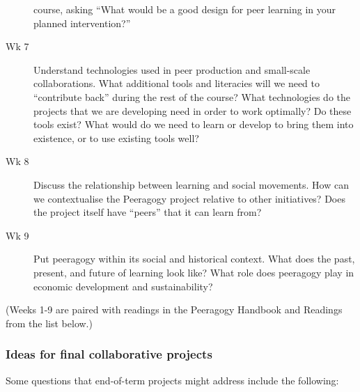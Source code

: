 \begin{description}
course, asking ``What would be a good design for peer learning in your
planned intervention?''
\item[Wk 7]
Understand technologies used in peer production and small-scale
collaborations. What additional tools and literacies will we need to
``contribute back'' during the rest of the course? What technologies do
the projects that we are developing need in order to work optimally? Do
these tools exist? What would do we need to learn or develop to bring
them into existence, or to use existing tools well?
\item[Wk 8]
Discuss the relationship between learning and social movements. How can
we contextualise the Peeragogy project relative to other initiatives?
Does the project itself have ``peers'' that it can learn from?
\item[Wk 9]
Put peeragogy within its social and historical context. What does the
past, present, and future of learning look like? What role does
peeragogy play in economic development and sustainability?
\end{description}

(Weeks 1-9 are paired with readings in the Peeragogy Handbook and
Readings from the list below.)

\hypertarget{ideas-for-final-collaborative-projects}{%
\subsubsection{Ideas for final collaborative
projects}\label{ideas-for-final-collaborative-projects}}

Some questions that end-of-term projects might address include the
following:

